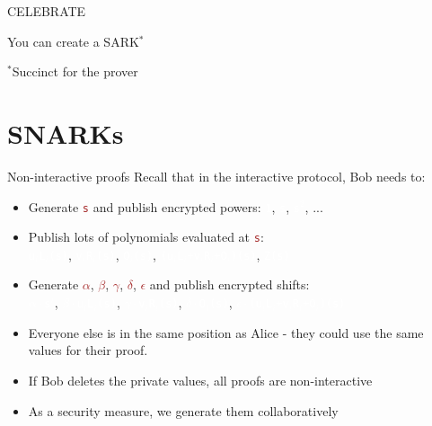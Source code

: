 \documentclass[dvipsnames]{beamer}
\newcommand{\priv}[1]{\textcolor{brown}{\texttt{#1}}}
\newcommand{\enc}[1]{\colorbox{SkyBlue!75}{\textcolor{white}{\texttt{#1}}}}
\begin{document}
    \begin{frame}{CELEBRATE}
        \vspace{2.5cm}
        \begin{center}
        {\Huge You can create a SARK$^*$}
            \\
        \end{center}

        \vspace{2.5cm}
        {\tiny $^*$Succinct for the prover}
    \end{frame}

    \section{SNARKs}

    \begin{frame}{Non-interactive proofs}
        Recall that in the interactive protocol, Bob needs to:
        \begin{itemize}
            \item Generate \priv{s} and publish encrypted powers: \enc{1}, \enc{s}, \enc{s$^2$}, ...
            \item Publish lots of polynomials evaluated at \priv{s}:\\
            \enc{u$_i$L$_i$(s)}, \enc{v$_i$R$_i$(s)}, \enc{O$_i$(s)}, \enc{(u$_i$L$_i$+v$_i$R$_i$+O$_i$)(s)}, \enc{Z(s)}
            \item Generate \priv{$\alpha$}, \priv{$\beta$}, \priv{$\gamma$}, \priv{$\delta$}, \priv{$\epsilon$} and publish encrypted shifts:\\
            \enc{$\alpha \cdot$s$^i$}, \enc{$\beta \cdot$u$_i$L$_i$(s)}, \enc{$\gamma \cdot$v$_i$R$_i$(s)}, \enc{$\delta \cdot$O$_i$(s)}, \enc{$\epsilon \cdot$(u$_i$L$_i$+v$_i$R$_i$+O$_i$)(s)}
            \item Everyone else is in the same position as Alice - they could use the same values for their proof.
            \item If Bob deletes the private values, all proofs are non-interactive
            \item As a security measure, we generate them collaboratively
        \end{itemize}
    \end{frame}
\end{document}
